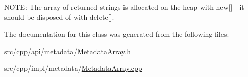 NOTE: The array of returned strings is allocated on the heap with new\mbox{[}\mbox{]} -\/ it should be disposed of with delete\mbox{[}\mbox{]}. 

The documentation for this class was generated from the following files:\begin{DoxyCompactItemize}
\item 
src/cpp/api/metadata/\hyperlink{MetadataArray_8h}{MetadataArray.h}\item 
src/cpp/impl/metadata/\hyperlink{MetadataArray_8cpp}{MetadataArray.cpp}\end{DoxyCompactItemize}
